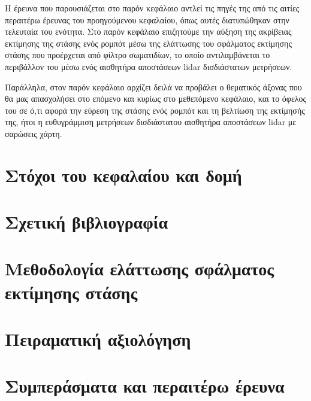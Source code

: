 Η έρευνα που παρουσιάζεται στο παρόν κεφάλαιο αντλεί τις πηγές της από τις
αιτίες περαιτέρω έρευνας του προηγούμενου κεφαλαίου, όπως αυτές διατυπώθηκαν
στην τελευταία του ενότητα. Στο παρόν κεφάλαιο επιζητούμε την αύξηση της
ακρίβειας εκτίμησης της στάσης ενός ρομπότ μέσω της ελάττωσης του σφάλματος
εκτίμησης στάσης που προέρχεται από φίλτρο σωματιδίων, το οποίο αντιλαμβάνεται
το περιβάλλον του μέσω ενός αισθητήρα αποστάσεων lidar δισδιάστατων μετρήσεων.

Παράλληλα, στον παρόν κεφάλαιο αρχίζει δειλά να προβάλει ο θεματικός άξονας που
θα μας απασχολήσει στο επόμενο και κυρίως στο μεθεπόμενο κεφάλαιο, και το όφελος
του σε ό,τι αφορά την εύρεση της στάσης ενός ρομπότ και τη βελτίωση της
εκτίμησής της, ήτοι η ευθυγράμμιση μετρήσεων δισδιάστατου αισθητήρα αποστάσεων
lidar με σαρώσεις χάρτη.

\section{Στόχοι του κεφαλαίου και δομή}
  \label{section:02_02_01}
  

\section{Σχετική βιβλιογραφία}
  \label{section:02_02_02}
  

\section{Μεθοδολογία ελάττωσης σφάλματος εκτίμησης στάσης}
  \label{section:02_02_03}
  

\section{Πειραματική αξιολόγηση}
  \label{section:02_02_04}
  

\section{Συμπεράσματα και περαιτέρω έρευνα}
  \label{section:02_02_05}
  
